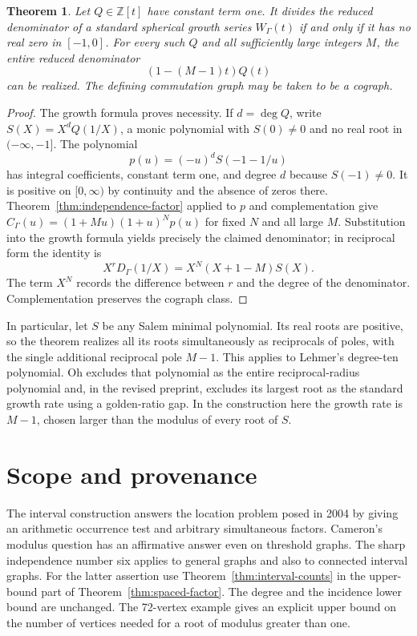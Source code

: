 \documentclass[11pt,a4paper]{article}
\newtheorem{theorem}{Theorem}[section]
\begin{document}
\begin{theorem}\label{thm:coxeter}
Let $Q\in\mathbb Z[t]$ have constant term one. It divides the reduced
denominator of a standard spherical growth series $W_\Gamma(t)$ if and
only if it has no real zero in $[-1,0]$. For every such $Q$ and all
sufficiently large integers $M$, the entire reduced denominator
\[
                    (1-(M-1)t)Q(t)
\]
can be realized. The defining commutation graph may be taken to be a cograph.
\end{theorem}
\begin{proof}
The growth formula proves necessity. If $d=\deg Q$, write
$S(X)=X^d Q(1/X)$, a monic polynomial with $S(0)\ne0$ and no real root
in $(-\infty,-1]$. The polynomial
\[
 p(u)=(-u)^d S(-1-1/u)
\]
has integral coefficients, constant term one, and degree $d$ because
$S(-1)\ne0$. It is positive on $[0,\infty)$ by continuity and the
absence of zeros there. Theorem~\ref{thm:independence-factor} applied to
$p$ and complementation give
$C_\Gamma(u)=(1+Mu)(1+u)^N p(u)$ for fixed $N$ and all large $M$.
Substitution into the growth formula yields precisely the claimed
denominator; in reciprocal form the identity is
\[
             X^rD_\Gamma(1/X)=X^N(X+1-M)S(X).
\]
The term $X^N$ records the difference between $r$ and the degree of the
denominator. Complementation preserves the cograph class.
\end{proof}

In particular, let $S$ be any Salem minimal polynomial. Its real roots
are positive, so the theorem realizes all its roots simultaneously as
reciprocals of poles, with the single additional reciprocal pole $M-1$.
This applies to Lehmer's degree-ten polynomial. Oh \cite{oh} excludes
that polynomial as the entire reciprocal-radius polynomial and, in the
revised preprint, excludes its largest root as the standard growth rate
using a golden-ratio gap. In the construction here the growth rate is
$M-1$, chosen larger than the modulus of every root of $S$.

\section*{Scope and provenance}
The interval construction answers the location problem posed in 2004 by giving an arithmetic occurrence test and arbitrary simultaneous factors. Cameron's modulus question has an affirmative answer even on threshold graphs. The sharp independence number six applies to general graphs and also to connected interval graphs. For the latter assertion use Theorem~\ref{thm:interval-counts} in the upper-bound part of Theorem~\ref{thm:spaced-factor}. The degree and the incidence lower bound are unchanged. The 72-vertex example gives an explicit upper bound on the number of vertices needed for a root of modulus greater than one.
\end{document}
